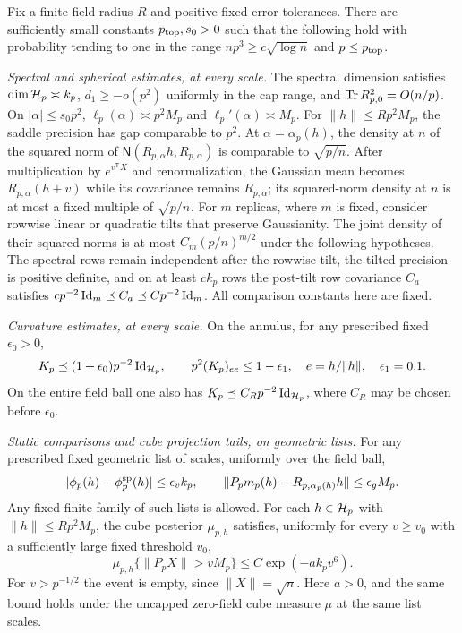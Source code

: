 \begin{proposition}\label{prop:edge-cap-inputs}
Fix a finite field radius $R$ and positive fixed error tolerances.  There
are sufficiently small constants $p_{\rm top},s_0>0$ such that the following
hold with probability tending to one in the range
$np^3\ge c\sqrt{\log n}$ and $p\le p_{\rm top}$.

\emph{Spectral and spherical estimates, at every scale.}
The spectral dimension satisfies $\dim\mathcal H_p\asymp k_p$,
$d_1\ge-o(p^2)$ uniformly in the cap range, and
$\operatorname{Tr} R_{p,0}^2=O(n/p)$.  On $|\alpha|\le s_0p^2$,
$\ell_p(\alpha)\asymp p^2M_p$ and
$\ell_p'(\alpha)\asymp M_p$.  For
$\|h\|\le Rp^2M_p$, the saddle precision has gap comparable to $p^2$.
At $\alpha=\alpha_p(h)$, the density at $n$ of the squared norm of
$\mathsf N(R_{p,\alpha}h,R_{p,\alpha})$ is comparable to $\sqrt{p/n}$.
After multiplication by $e^{v^{\mathsf T}X}$ and renormalization, the
Gaussian mean becomes $R_{p,\alpha}(h+v)$ while its covariance remains
$R_{p,\alpha}$; its squared-norm density at $n$ is at most a fixed
multiple of $\sqrt{p/n}$.  For $m$ replicas, where $m$ is fixed, consider
rowwise linear or quadratic tilts that preserve Gaussianity.  The joint
density of their squared norms is at most $C_m(p/n)^{m/2}$ under the
following hypotheses.  The spectral rows remain independent after the rowwise tilt,
the tilted precision is positive definite, and on at least $ck_p$ rows
the post-tilt row covariance $C_a$ satisfies
$c p^{-2}\operatorname{Id}_m\preceq C_a\preceq C p^{-2}\operatorname{Id}_m$.
All comparison constants here are fixed.

\emph{Curvature estimates, at every scale.}
On the annulus, for any prescribed fixed $\epsilon_0>0$,
\begin{equation}\label{eq:source-6}
 K_p\preceq(1+\epsilon_0)p^{-2}\operatorname{Id}_{\mathcal H_p},\qquad
 p^2(K_p)_{ee}\le1-\epsilon_1,
 \quad e=h/\|h\|,\quad \epsilon_1=0.1.
\end{equation}
On the entire field ball one also has $K_p\preceq C_Rp^{-2}\operatorname{Id}_{\mathcal H_p}$,
where $C_R$ may be chosen before $\epsilon_0$.

\emph{Static comparisons and cube projection tails, on geometric lists.}
For any prescribed fixed geometric list of scales, uniformly over the field ball,
\[
 |\phi_p(h)-\phi_p^{\rm sp}(h)|\le\epsilon_v k_p,
 \qquad
 \|P_pm_p(h)-R_{p,\alpha_p(h)}h\|\le\epsilon_gM_p.
\]
Any fixed finite family of such lists is allowed.  For each
$h\in\mathcal H_p$ with $\|h\|\le Rp^2M_p$, the cube posterior $\mu_{p,h}$
satisfies, uniformly for every $v\ge v_0$ with a sufficiently large fixed
threshold $v_0$,
\[
 \mu_{p,h}\{\|P_pX\|>vM_p\}\le C\exp(-ak_pv^6).
\]
For $v>p^{-1/2}$ the event is empty, since $\|X\|=\sqrt n$.
Here $a>0$, and the same bound holds under the uncapped zero-field cube
measure $\mu$ at the same list scales.


\end{proposition}
